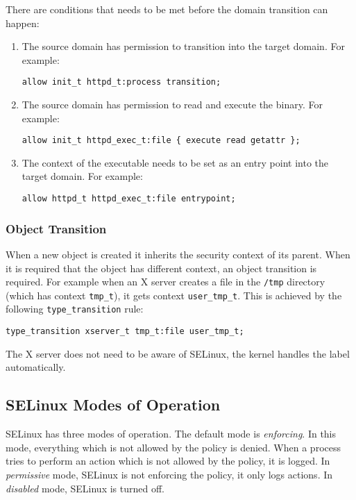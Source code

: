 There are conditions that needs to be met before the domain transition can
happen:
\begin{enumerate}
    \item The source domain has permission to transition into the target domain.
        For example:
\begin{lstlisting}
allow init_t httpd_t:process transition;
\end{lstlisting}
    \item The source domain has permission to read and execute the binary. For
        example:
\begin{lstlisting}
allow init_t httpd_exec_t:file { execute read getattr };
\end{lstlisting}
    \item The context of the executable needs to be set as an entry point into
        the target domain. For example:
\begin{lstlisting}
allow httpd_t httpd_exec_t:file entrypoint;
\end{lstlisting}
\end{enumerate}

\subsubsection{Object Transition}
When a new object is created it inherits the security context of its parent.
When it is required that the object has different context, an object transition
is required.
For example when an X server creates a file in the \texttt{/tmp} directory
(which has context \texttt{tmp\_t}), it gets context \texttt{user\_tmp\_t}. This
is achieved by the following \texttt{type\_transition} rule:
\begin{lstlisting}
type_transition xserver_t tmp_t:file user_tmp_t;
\end{lstlisting}
The X server does not need to be aware of SELinux, the kernel handles the label
automatically.

\subsection{SELinux Modes of Operation}

SELinux has three modes of operation. The default mode is \emph{enforcing}. In
this mode, everything which is not allowed by the policy is denied. When a
process tries to perform an action which is not allowed by the policy, it is
logged. In \emph{permissive} mode, SELinux is not enforcing the policy, it only
logs actions. In \emph{disabled} mode, SELinux is turned off.

